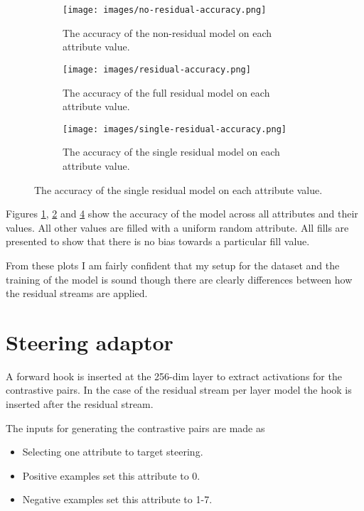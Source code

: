\documentclass[]{article}
\begin{document}
\begin{figure}
    \centering
    \begin{subfigure}{0.9\textwidth}
        \texttt{[image: images/no-residual-accuracy.png]}
        \caption{The accuracy of the non-residual model on each attribute value.}
        \label{fig:nr-accuracy}
    \end{subfigure}
    \begin{subfigure}{0.9\textwidth}
        \texttt{[image: images/residual-accuracy.png]}
        \caption{The accuracy of the full residual model on each attribute value.}
        \label{fig:r-accuracy}
    \end{subfigure}
    \begin{subfigure}{0.9\textwidth}
        \texttt{[image: images/single-residual-accuracy.png]}
        \caption{The accuracy of the single residual model on each attribute value.}
        \label{fig:sr-accuracy}
    \end{subfigure}
\end{figure}

Figures \ref{fig:nr-accuracy}, \ref{fig:r-accuracy} and \ref{fig:sr-accuracy} show the accuracy of the model across all attributes and their values.
All other values are filled with a uniform random attribute.
All fills are presented to show that there is no bias towards a particular fill value.

From these plots I am fairly confident that my setup for the dataset and the training of the model is sound though there are clearly differences between how the residual streams are applied.

\section{Steering adaptor}

A forward hook is inserted at the 256-dim layer to extract activations for the contrastive pairs.
In the case of the residual stream per layer model the hook is inserted after the residual stream.

The inputs for generating the contrastive pairs are made as

\begin{itemize}
    \item Selecting one attribute to target steering.
    \item Positive examples set this attribute to 0.
    \item Negative examples set this attribute to 1-7.
\end{itemize}
\end{document}
